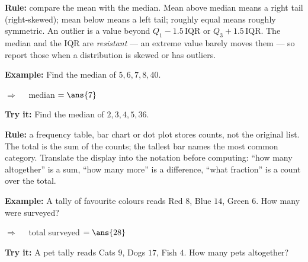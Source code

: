 \documentclass[12pt]{article}
\begin{document}

\begin{formulabox}
\textbf{Rule:} compare the mean with the median. Mean above median means a right tail
(right-skewed); mean below means a left tail; roughly equal means roughly symmetric.
An outlier is a value beyond $Q_1 - 1.5\,\text{IQR}$ or $Q_3 + 1.5\,\text{IQR}$. The median and
the IQR are \emph{resistant} --- an extreme value barely moves them --- so report those when a
distribution is skewed or has outliers.
\end{formulabox}

\begin{examplebox}
\textbf{Example:} \quad Find the median of $5, 6, 7, 8, 40$.

$\Rightarrow\quad$ median $= \ans{7}$
\end{examplebox}

\begin{tryitbox}
\textbf{Try it:} \quad Find the median of $2, 3, 4, 5, 36$.\\[2pt]
\end{tryitbox}


\begin{formulabox}
\textbf{Rule:} a frequency table, bar chart or dot plot stores counts, not the original list.
The total is the sum of the counts; the tallest bar names the most common category. Translate
the display into the notation before computing: ``how many altogether'' is a sum, ``how many
more'' is a difference, ``what fraction'' is a count over the total.
\end{formulabox}

\begin{examplebox}
\textbf{Example:} \quad A tally of favourite colours reads Red $8$, Blue $14$, Green $6$. How many were surveyed?

$\Rightarrow\quad$ total surveyed $= \ans{28}$
\end{examplebox}

\begin{tryitbox}
\textbf{Try it:} \quad A pet tally reads Cats $9$, Dogs $17$, Fish $4$. How many pets altogether?\\[2pt]
\end{tryitbox}
\end{document}
